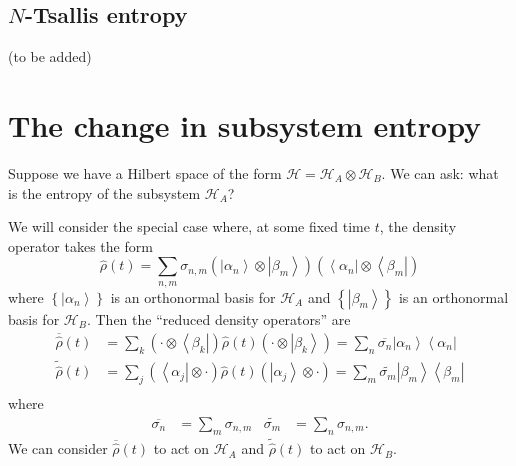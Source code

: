 \documentclass[11pt]{article}
\newcommand{\bra}[1]{\left\langle#1\right|}
\newcommand{\ket}[1]{\left|#1\right\rangle}
\newcommand{\hilb}{\mathcal{H}}
\newcommand{\op}[1]{\hat{#1}}
\theoremstyle{theorem}
\theoremstyle{remark}
\theoremstyle{step}
\theoremstyle{gap}
\begin{document}
\subsection{\(N\)-Tsallis entropy}

(to be added)


\section{The change in subsystem entropy}

Suppose we have a Hilbert space of the form \(\hilb = \hilb_A \otimes \hilb_B\). We can ask: what is the entropy of the subsystem \(\hilb_A\)?

We will consider the special case where, at some fixed time \(t\), the density operator takes the form
\begin{equation}\label{eq.densdecompred}
\op{\rho}(t) = \sum_{n,m} \sigma_{n,m} \left(\ket{\alpha_n}\otimes\ket{\beta_m}\right)\left(\bra{\alpha_n}\otimes\bra{\beta_m}\right) 
\end{equation}
where \(\left\{\ket{\alpha_n}\right\}\) is an orthonormal basis for \(\hilb_A\) and \(\left\{\ket{\beta_m}\right\}\) is an orthonormal basis for \(\hilb_B\). 
Then the ``reduced density operators'' are
\begin{align*}
\overline{\op{\rho}}(t)
&= \sum_k \left(\cdot\otimes\bra{\beta_k}\right) \op{\rho}(t) \left(\cdot\otimes\ket{\beta_k}\right) 
= \sum_n \overline{\sigma_n} \ket{\alpha_n}\bra{\alpha_n} \\
\widetilde{\op{\rho}}(t)
&= \sum_j \left(\bra{\alpha_j}\otimes\cdot\right) \op{\rho}(t) \left(\ket{\alpha_j}\otimes\cdot\right) 
= \sum_m \widetilde{\sigma_m} \ket{\beta_m}\bra{\beta_m} \\
\end{align*}
where
\begin{align*}
\overline{\sigma_n} &= \sum_m \sigma_{n,m} &
\widetilde{\sigma_m} &= \sum_n \sigma_{n,m}.
\end{align*}
We can consider \(\overline{\op{\rho}}(t)\) to act on \(\hilb_A\) and \(\widetilde{\op{\rho}}(t)\) to act on \(\hilb_B\).
\end{document}
